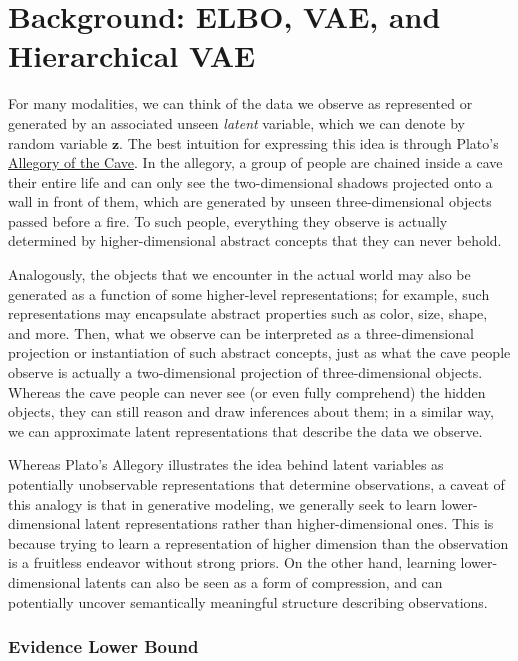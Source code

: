 \section*{Background: ELBO, VAE, and Hierarchical VAE}
%

For many modalities, we can think of the data we observe as represented or generated by an associated unseen \textit{latent} variable, which we can denote by random variable $\bm{z}$.  The best intuition for expressing this idea is through Plato's \href{https://en.wikipedia.org/wiki/Allegory_of_the_cave}{Allegory of the Cave}.  In the allegory, a group of people are chained inside a cave their entire life and can only see the two-dimensional shadows projected onto a wall in front of them, which are generated by unseen three-dimensional objects passed before a fire.  To such people, everything they observe is actually determined by higher-dimensional abstract concepts that they can never behold.

Analogously, the objects that we encounter in the actual world may also be generated as a function of some higher-level representations; for example, such representations may encapsulate abstract properties such as color, size, shape, and more.  Then, what we observe can be interpreted as a three-dimensional projection or instantiation of such abstract concepts, just as what the cave people observe is actually a two-dimensional projection of three-dimensional objects.  Whereas the cave people can never see (or even fully comprehend) the hidden objects, they can still reason and draw inferences about them; in a similar way, we can approximate latent representations that describe the data we observe.

Whereas Plato’s Allegory illustrates the idea behind latent variables as potentially unobservable representations that determine observations, a caveat of this analogy is that in generative modeling, we generally seek to learn lower-dimensional latent representations rather than higher-dimensional ones.  This is because trying to learn a representation of higher dimension than the observation is a fruitless endeavor without strong priors.  On the other hand, learning lower-dimensional latents can also be seen as a form of compression, and can potentially uncover semantically meaningful structure describing observations.


\subsubsection*{Evidence Lower Bound}
%

